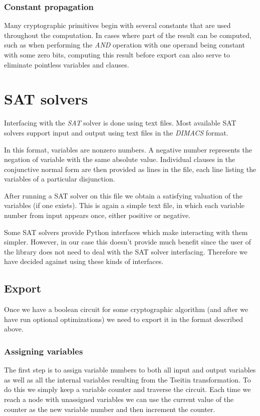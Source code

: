 \subsubsection{Constant propagation}
Many cryptographic primitives begin with several constants that are used throughout the computation.
In cases where part of the result can be computed, such as when performing the \emph{AND} operation with one operand being constant with some zero bits, computing this result before export can also serve to eliminate pointless variables and clauses.


\section{SAT solvers}

Interfacing with the \emph{SAT} solver is done using 	text files.
Most available SAT solvers support input and output using text files in the \emph{DIMACS} format.

In this format, variables are nonzero numbers.
A negative number represents the negation of variable with the same absolute value.
Individual clauses in the conjunctive normal form are then provided as lines in the file, each line listing the variables of a particular disjunction.

After running a SAT solver on this file we obtain a satisfying valuation of the variables (if one exists).
This is again a simple text file, in which each variable number from input appears once, either positive or negative.

Some SAT solvers provide Python interfaces which make interacting with them simpler.
However, in our case this doesn't provide much benefit since the user of the library does not need to deal with the SAT solver interfacing.
Therefore we have decided against using these kinds of interfaces.

\subsection{Export}

Once we have a boolean circuit for some cryptographic algorithm (and after we have run optional optimizations) we need to export it in the format described above.

\subsubsection{Assigning variables}
The first step is to assign variable numbers to both all input and output variables as well as all the internal variables resulting from the Tseitin transformation.
To do this we simply keep a variable counter and traverse the circuit.
Each time we reach a node with unassigned variables we can use the current value of the counter as the new variable number and then increment the counter.

